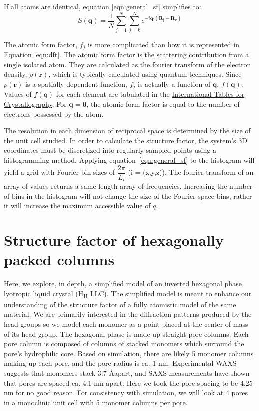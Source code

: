 \documentclass{article}
\begin{document}
  If all atoms are identical, equation \ref{eqn:general_sf} simplifies to:
  \begin{equation}
  S(\mathbf{q})= \dfrac{1}{N}\sum_{j=1}^{N}\sum_{j=k}^{N}e^{-i\mathbf{q}\boldsymbol{\cdot}(\mathbf{R_j}- \mathbf{R_k})}
  \label{eqn:simplified_sf}
  \end{equation}

  The atomic form factor, $f_j$ is more complicated than how it is represented
  in Equation \ref{eqn:dft}. The atomic form factor is the scattering
  contribution from a single isolated atom. They are calculated as the fourier
  transform of the electron density, $\rho({\mathbf{r}})$,  which is typically
  calculated using quantum techniques. Since $\rho({\mathbf{r}})$ is a spatially
  dependent function, $f_j$ is actually a function of $\mathbf{q}$,
  $f(\mathbf{q})$. Values of $f(\mathbf{q})$ for each element are tabulated in
  the \href{http://it.iucr.org/Cb/ch6o1v0001/}{International Tables for
  Crystallography}. For $\mathbf{q}=\mathbf{0}$, the atomic form factor is equal to the 
  number of electrons possessed by the atom. 

  The resolution in each dimension of reciprocal space is determined by the
  size of the unit cell studied. In order to calculate the structure factor, the
  system's 3D coordinates must be discretized into regularly sampled points using
  a histogramming method. Applying equation~\ref{eqn:general_sf} to the histogram
  will yield a grid with Fourier bin sizes of $\dfrac{2\pi}{L_i}$ (i = (x,y,z)).
  The fourier transform of an array of values returns a same length array of
  frequencies. Increasing the number of bins in the histogram will not change the
  size of the Fourier space bins, rather it will increase the maximum accessible
  value of $q$. 

  \section{Structure factor of hexagonally packed columns}

  Here, we explore, in depth, a simplified model of an inverted hexagonal phase
  lyotropic liquid crystal (H\textsubscript{II} LLC). The simplified model is
  meant to enhance our understanding of the structure factor of a fully atomistic
  model of the same material. We are primarily interested in the diffraction
  patterns produced by the head groups so we model each monomer as a point placed
  at the center of mass of its head group. The hexagonal phase is made up
  straight pore columns. Each pore column is composed of columns of stacked
  monomers which surround the pore's hydrophilic core. Based on simulation, there
  are likely 5 monomer columns making up each pore, and the pore radius is ca. 1
  nm. Experimental WAXS suggests that monomers stack 3.7 \AA apart, and SAXS
  measurements have shown that pores are spaced ca. 4.1 nm apart. Here we took the 
  pore spacing to be 4.25 nm for no good reason. For consistency with simulation,
  we will look at 4 pores in a monoclinic unit cell with 5 monomer columns per pore. 
\end{document}
